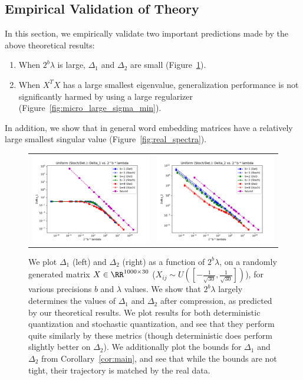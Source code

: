 \subsection{Empirical Validation of Theory}
\label{subsec:emp_valid}
In this section, we empirically validate two important predictions made by the above theoretical results:
\begin{enumerate}
	\item When $2^b \lambda$ is large, $\Delta_1$ and $\Delta_2$ are small (Figure~\ref{fig:micro_d1d2}).
	\item When $X^T X$ has a large smallest eigenvalue, generalization performance is not significantly harmed by using a large regularizer
	(Figure~\ref{fig:micro_large_sigma_min}).
\end{enumerate}

In addition, we show that in general word embedding matrices have a relatively large smallest singular value (Figure~\ref{fig:real_spectra}).

\begin{figure}
	\centering
	\begin{tabular}{c c}
		\includegraphics[width=0.4\linewidth]{figures/micro_uniform_nonadapt_delta1_vs_2_b_lambda.pdf} &	
		\includegraphics[width=0.4\linewidth]{figures/micro_uniform_nonadapt_delta2_vs_2_b_lambda.pdf}
	\end{tabular}
	\caption{We plot $\Delta_1$ (left) and $\Delta_2$ (right) as a function of $2^b\lambda$, on a randomly generated matrix $X\in\RR^{1000\times 30}$ ($X_{ij}\sim U([-\frac{1}{\sqrt{30}},\frac{1}{\sqrt{30}}])$), for various precisions $b$ and $\lambda$ values.  We show that $2^b \lambda$ largely determines the values of $\Delta_1$ and $\Delta_2$ after compression, as predicted by our theoretical results. We plot results for both deterministic quantization and stochastic quantization, and see that they perform quite similarly by these metrics (though deterministic does perform slightly better on $\Delta_2$). We additionally plot the bounds for $\Delta_1$ and $\Delta_2$ from Corollary~\ref{cor:main}, and see that while the bounds are not tight, their trajectory is matched by the real data.}
	\label{fig:micro_d1d2}
\end{figure}

